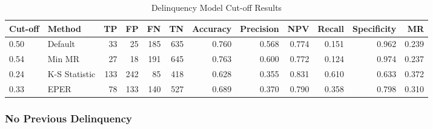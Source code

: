 \begin{table}[H]
	\centering
	\resizebox{\textwidth}{!}
	{
	\begin{tabular}{l|l|r|r|r|r|r|r|r|r|r|r}
		\hline
		\textbf{Cut-off} & \textbf{Method}                                                         & \textbf{TP} & \textbf{FP} & \textbf{FN} & \textbf{TN} & \textbf{Accuracy} & \textbf{Precision} & \textbf{NPV} & \textbf{Recall} & \textbf{Specificity} & \textbf{MR}
		 \\ \hline
		0.50            & Default                                                                 & 33          & 25          & 185         & 635         & 0.760             & 0.568              & 0.774        & 0.151           & 0.962                & 0.239       \\
		0.54            & Min MR                                                                  & 27          & 18          & 191         & 645         & 0.763             & 0.600              & 0.772        & 0.124           & 0.974                & 0.237       \\
		0.24            & K-S Statistic                                                           & 133         & 242         & 85          & 418         & 0.628             & 0.355              & 0.831        & 0.610           & 0.633                & 0.372       \\
		0.33            & EPER & 78          & 133         & 140         & 527         & 0.689             & 0.370              & 0.790        & 0.358           & 0.798                & 0.310    \\
		\hline  
	\end{tabular}
	}
	\caption{Delinquency Model Cut-off Results }
	\label{my-label}
\end{table}

\subsubsection{No Previous Delinquency}

